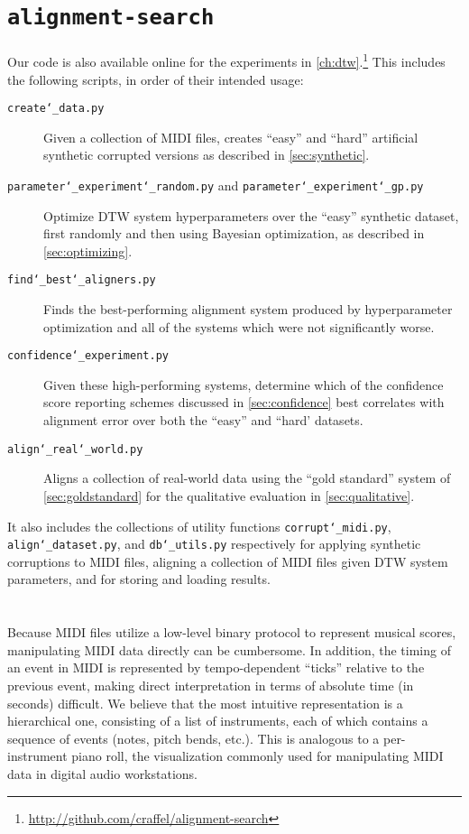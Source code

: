\section{\texttt{alignment-search}}

Our code is also available online for the experiments in \cref{ch:dtw}.\footnote{\url{http://github.com/craffel/alignment-search}}
This includes the following scripts, in order of their intended usage:
\begin{description}
\item[\texttt{create\char`_data.py}] Given a collection of MIDI files, creates ``easy'' and ``hard'' artificial synthetic corrupted versions as described in \cref{sec:synthetic}.
\item[\texttt{parameter\char`_experiment\char`_random.py} and \texttt{parameter\char`_experiment\char`_gp.py}] Optimize DTW system hyperparameters over the ``easy'' synthetic dataset, first randomly and then using Bayesian optimization, as described in \cref{sec:optimizing}.
\item[\texttt{find\char`_best\char`_aligners.py}] Finds the best-performing alignment system produced by hyperparameter optimization and all of the systems which were not significantly worse.
\item[\texttt{confidence\char`_experiment.py}] Given these high-performing systems, determine which of the confidence score reporting schemes discussed in \cref{sec:confidence} best correlates with alignment error over both the ``easy'' and ``hard' datasets.
\item[\texttt{align\char`_real\char`_world.py}] Aligns a collection of real-world data using the ``gold standard'' system of \cref{sec:goldstandard} for the qualitative evaluation in \cref{sec:qualitative}.
\end{description}

It also includes the collections of utility functions \texttt{corrupt\char`_midi.py}, \texttt{align\char`_dataset.py}, and \texttt{db\char`_utils.py} respectively for applying synthetic corruptions to MIDI files, aligning a collection of MIDI files given DTW system parameters, and for storing and loading results.

\section{\prettymidi{}}
\label{sec:pretty_midi}

Because MIDI files utilize a low-level binary protocol to represent musical scores, manipulating MIDI data directly can be cumbersome.
In addition, the timing of an event in MIDI is represented by tempo-dependent ``ticks'' relative to the previous event, making direct interpretation in terms of absolute time (in seconds) difficult.
We believe that the most intuitive representation is a hierarchical one, consisting of a list of instruments, each of which contains a sequence of events (notes, pitch bends, etc.).
This is analogous to a per-instrument piano roll, the visualization commonly used for manipulating MIDI data in digital audio workstations.

